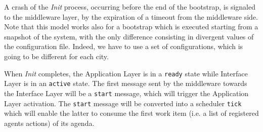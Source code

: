 A crash of the \textit{Init} process, occurring before the end of the bootstrap,
is signaled to the middleware layer, by the expiration of a timeout from the
middleware side.
Note that this model works also for a bootstrap which is executed starting
from a snapshot of the system, with the only difference consisting in divergent
values of the configuration file. Indeed, we have to use a set of
configurations, which is going to be different for each city.


When \textit{Init} completes, the Application Layer is in a \verb|ready| state
while Interface Layer is in an \verb|active| state.
The first message sent by the middleware towards the
Interface Layer will be a \verb|start| message,
which will trigger the Application Layer activation.
The \verb|start| message will be converted into a scheduler
\verb|tick| which will enable the latter to consume the first work item
(i.e. a list of registered agents actions) of its agenda.